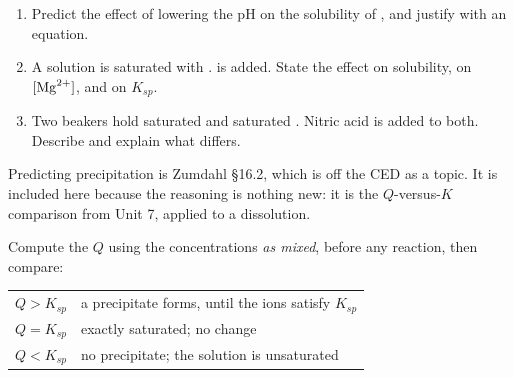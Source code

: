 \documentclass{apchem-notes}
\begin{document}

\begin{enumerate}[leftmargin=*,itemsep=0.4em]
  \item Predict the effect of lowering the pH on the solubility of
        , and justify with an equation.
  \item A solution is saturated with .  is added.
        State the effect on solubility, on $[\ce{Mg^2+}]$, and on
        $K_{sp}$. 
  \item Two beakers hold saturated  and saturated .
        Nitric acid is added to both. Describe and explain what differs.
\end{enumerate}


\begin{apcnote}
Predicting precipitation is Zumdahl \S16.2, which is off the CED as a topic.
It is included here because the reasoning is nothing new: it is the
$Q$-versus-$K$ comparison from Unit 7, applied to a dissolution.
\end{apcnote}

Compute the  $Q$ using the concentrations \emph{as mixed},
before any reaction, then compare:

\begin{center}
\begin{tabular}{@{}ll@{}}
\hline
$Q > K_{sp}$ & a precipitate forms, until the ions satisfy $K_{sp}$ \\
$Q = K_{sp}$ & exactly saturated; no change \\
$Q < K_{sp}$ & no precipitate; the solution is unsaturated \\
\hline
\end{tabular}
\end{center}
\end{document}
